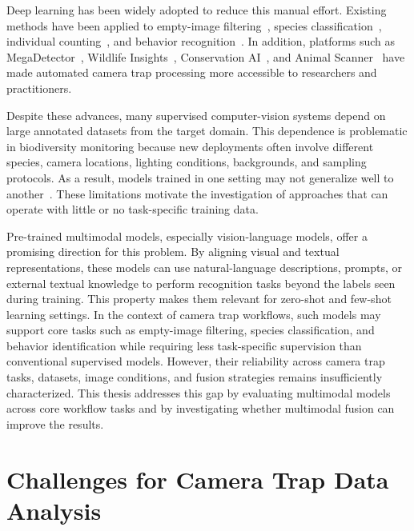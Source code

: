 Deep learning has been widely adopted to reduce this manual effort. Existing methods have been applied to empty-image filtering~\citep{mononen2025active, yousif2019animal, yang2024systematic, cunha2021filtering}, species classification~\citep{chen2023applying, velez2023evaluation, beery2018recognition, norouzzadeh2018automatically}, individual counting~\citep{norouzzadeh2018automatically, norouzzadeh2021deep, arshad2020my, wang2022deep}, and behavior recognition~\citep{schindler2021identification, bain2021automated, binta2023animal, lu2023mammalclub}. In addition, platforms such as MegaDetector~\citep{beery2019efficient}, Wildlife Insights~\citep{ahumada2020wildlife}, Conservation AI~\citep{chalmers2019conservation}, and Animal Scanner~\citep{yousif2019animal} have made automated camera trap processing more accessible to researchers and practitioners.

Despite these advances, many supervised computer-vision systems depend on large annotated datasets from the target domain. This dependence is problematic in biodiversity monitoring because new deployments often involve different species, camera locations, lighting conditions, backgrounds, and sampling protocols. As a result, models trained in one setting may not generalize well to another~\citep{beery2021scaling, yang2021systematic, zhu2022class, malik2021two, cunha2023bag}. These limitations motivate the investigation of approaches that can operate with little or no task-specific training data.

Pre-trained multimodal models, especially vision-language models, offer a promising direction for this problem. By aligning visual and textual representations, these models can use natural-language descriptions, prompts, or external textual knowledge to perform recognition tasks beyond the labels seen during training. This property makes them relevant for zero-shot and few-shot learning settings. In the context of camera trap workflows, such models may support core tasks such as empty-image filtering, species classification, and behavior identification while requiring less task-specific supervision than conventional supervised models. However, their reliability across camera trap tasks, datasets, image conditions, and fusion strategies remains insufficiently characterized. This thesis addresses this gap by evaluating multimodal models across core workflow tasks and by investigating whether multimodal fusion can improve the results.

\section{Challenges for Camera Trap Data Analysis}


